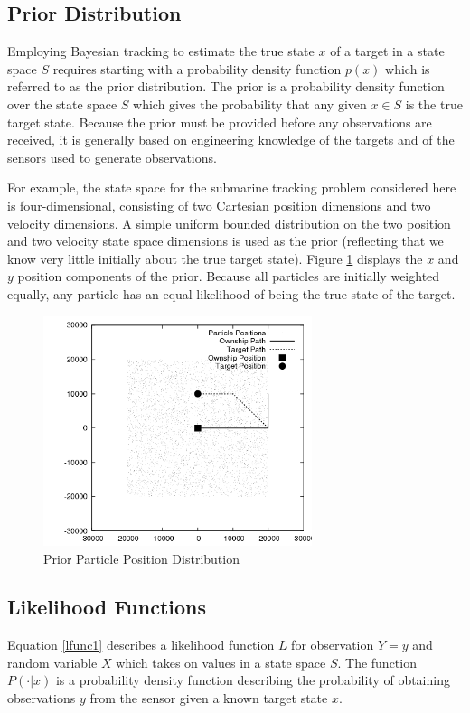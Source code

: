 \documentclass{article}
\begin{document}
\subsection{Prior Distribution}\label{Prior Distribution}
Employing Bayesian tracking to estimate the true state \(x\) of a target in a state space \(S\) requires starting with a probability density function \(p(x)\) which is referred to as the prior distribution. The prior is a probability density function over the state space \(S\) which gives the probability that any given \(x \in S\) is the true target state. Because the prior must be provided before any observations are received, it is generally based on engineering knowledge of the targets and of the sensors used to generate observations.

For example, the state space for the submarine tracking problem considered here is four-dimensional, consisting of two Cartesian position dimensions and two velocity dimensions. A simple uniform bounded distribution on the two position and two velocity state space dimensions is used as the prior (reflecting that we know very little initially about the true target state). Figure \ref{prior} displays the \(x\) and \(y\) position components of the prior. Because all particles are initially weighted equally, any particle has an equal likelihood of being the true state of the target.

\begin{figure}
\centering
\includegraphics[width=0.7\textwidth]{data/particles_prior.png}
\caption{Prior Particle Position Distribution}
\label{prior}
\end{figure}

\subsection{Likelihood Functions}\label{Likelihood Functions}
Equation \ref{lfunc1} describes a likelihood function \(L\) for observation \(Y=y\) and random variable \(X\) which takes on values in a state space \(S\). The function \(P(\cdot|x)\) is a probability density function describing the probability of obtaining observations \(y\) from the sensor given a known target state \(x\).
\end{document}
